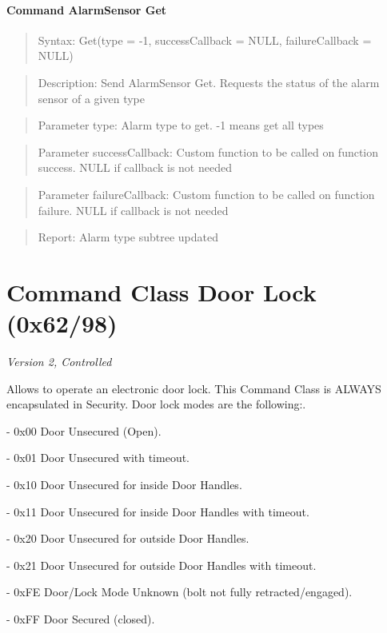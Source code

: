 \paragraph{Command AlarmSensor Get}
\begin{quote}Syntax: Get(type = -1, successCallback = NULL, failureCallback = NULL)\end{quote}
\begin{quote}Description: Send AlarmSensor Get. Requests the status of the alarm sensor of a given type\end{quote}
\begin{quote}Parameter type: Alarm type to get. -1 means get all types\end{quote}
\begin{quote}Parameter successCallback: Custom function to be called on function success. NULL if callback is not needed\end{quote}
\begin{quote}Parameter failureCallback: Custom function to be called on function failure. NULL if callback is not needed\end{quote}
\begin{quote}Report: Alarm type subtree updated\end{quote}


\section{Command Class Door Lock (0x62/98)}

\textit{Version 2, Controlled}
\newline

Allows to operate an electronic door lock. This Command Class is ALWAYS encapsulated in Security. Door lock modes are the following:. 

- 0x00 Door Unsecured (Open). 

- 0x01 Door Unsecured with timeout. 

- 0x10 Door Unsecured for inside Door Handles. 

- 0x11 Door Unsecured for inside Door Handles with timeout. 

- 0x20 Door Unsecured for outside Door Handles. 

- 0x21 Door Unsecured for outside Door Handles with timeout. 

- 0xFE Door/Lock Mode Unknown (bolt not fully retracted/engaged). 

- 0xFF Door Secured (closed).
\newline

